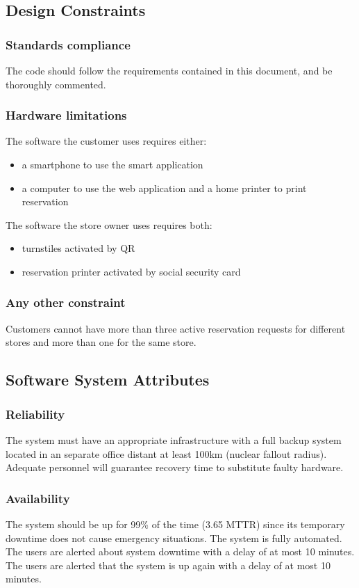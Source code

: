 \subsection{Design Constraints}
\subsubsection{Standards compliance}
The code should follow the requirements contained in this document, and be thoroughly commented.
\subsubsection{Hardware limitations}
The software the customer uses requires either:
\begin{itemize}
	\item a smartphone to use the smart application
	\item a computer to use the web application and a home printer to print reservation
\end{itemize}
The software the store owner uses requires both:
\begin{itemize}
	\item turnstiles activated by QR
	\item reservation printer activated by social security card
\end{itemize}
\subsubsection{Any other constraint}
Customers cannot have more than three active reservation requests for different stores and more than one for the same store.
\subsection{Software System Attributes}
\subsubsection{Reliability}
The system must have an appropriate infrastructure with a full backup system located in an separate office distant at least 100km (nuclear fallout radius). Adequate personnel will guarantee recovery time to substitute faulty hardware.
\subsubsection{Availability}
The system should be up for 99\% of the time (3.65 MTTR) since its temporary downtime does not cause emergency situations. The system is fully automated. The users are alerted about system downtime with a delay of at most 10 minutes. The users are alerted that the system is up again with a delay of at most 10 minutes.
